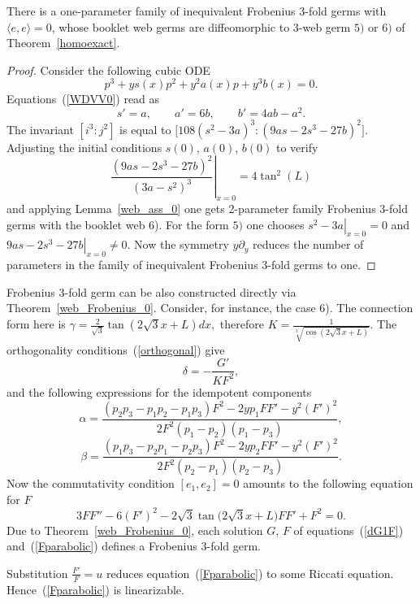 \documentclass[pdftex]{sigma}
\begin{document}
\begin{proposition}
 There is a one-parameter family of inequivalent Frobenius $3$-fold germs with $\langle e,e\rangle =0$,
 whose booklet web germs are diffeomorphic to $3$-web germ $5)$ or $6)$ of Theorem~{\rm\ref{homoexact}}.
\end{proposition}
\begin{proof} Consider the following cubic ODE
\[
p^3+ys(x)p^2+y^2a(x)p+y^3b(x)=0.
\]
Equations~(\ref{WDVV0}) read as
\[
s'=a,\qquad a'=6b, \qquad b'=4ab-a^2.
\]
The invariant $[i^3:j^2]$ is equal to $\big[108(s^2-3a)^3:(9as-2s^3-27b)^2\big]$.
Adjusting the initial conditions $s(0)$, $a(0)$, $b(0)$ to verify
\[
\left.\frac{(9as-2s^3-27b)^2}{(3a-s^2)^3}\right|_{x=0}=4\tan^2(L)
\]
 and applying Lemma~\ref{web_ass_0} one gets 2-parameter family Frobenius $3$-fold germs with the booklet web 6).
For the form $5)$ one chooses $\left.s^2-3a\right|_{x=0}=0$ and $\left.9as-2s^3-27b\right|_{x=0}\ne 0$. Now the symmetry $y\partial_y$ reduces the number of parameters in the family of inequivalent Frobenius $3$-fold germs to one.
\end{proof}
\begin{remark} Frobenius $3$-fold germ can be also constructed directly via Theorem~\ref{web_Frobenius_0}. Consider, for instance, the case 6).
The connection form here is
$\gamma=\frac{2}{\sqrt3}\tan(2\sqrt3 x+L)dx,$ therefore $K=\frac{1}{\sqrt[3]{\cos(2\sqrt 3 x+L)}}$.
 The orthogonality conditions~(\ref{orthogonal}) give
 \begin{equation}\label{dG1F}
 \delta= -\frac{G'}{KF^2},
 \end{equation}
 and the following expressions for the idempotent components
 \[
 \alpha=\frac{(p_2p_3-p_1p_2-p_1p_3)F^2-2yp_1FF'-y^2(F')^2}{2F^2(p_1-p_2)(p_1-p_3)},
 \]
 \[
 \beta=\frac{(p_1p_3-p_2p_1-p_2p_3)F^2-2yp_2FF'-y^2(F')^2}{2F^2(p_2-p_1)(p_2-p_3)}.
 \]
 Now the commutativity condition
$[e_1,e_2]=0$ amounts to the following equation for $F$
 \begin{equation}\label{Fparabolic}
 3FF''-6(F')^2-2\sqrt3\tan\big(2\sqrt3x+L\big)FF'+F^2=0.
 \end{equation}
 Due to Theorem~\ref{web_Frobenius_0}, each solution $G$, $F$ of equations~(\ref{dG1F}) and~(\ref{Fparabolic})
 def\/ines a Frobenius $3$-fold germ.
\end{remark}
\begin{remark}
Substitution $\frac{F'}{F}=u$ reduces equation~(\ref{Fparabolic}) to some Riccati equation.
Hence~(\ref{Fparabolic}) is linearizable.
\end{remark}
\end{document}
